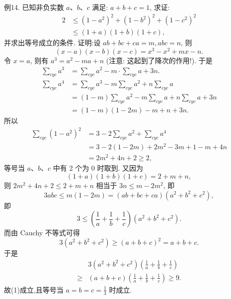 例14. 已知非负实数 $a 、 b 、 c$ 满足: $a+b+c=1$, 求证:
$$
\begin{aligned}
2 & \leqslant\left(1-a^2\right)^2+\left(1-b^2\right)^2+\left(1-c^2\right)^2 \\
& \leqslant(1+a)(1+b)(1+c),
\end{aligned}
$$
并求出等号成立的条件.
证明:设 $a b+b c+c a=m, a b c=n$, 则
$$
(x-a)(x-b)(x-c)=x^3-x^2+m x-n .
$$
令 $x=a$, 则有 $a^3=a^2-m a+n$ (注意: 这起到了降次的作用!). 于是
$$
\begin{aligned}
\sum_{c y c} a^3 & =\sum_{c y c} a^2-m \cdot \sum_{c y c} a+3 n . \\
\sum_{c y c} a^4 & =\sum_{c y c} a^3-m \sum_{c y c} a^2+n \sum_{c y c} a \\
& =(1-m) \sum_{c y c} a^2-m \sum_{c y c} a+n \sum_{c y c} a+3 n \\
& =(1-m)(1-2 m)-m+n+3 n .
\end{aligned}
$$
所以
$$
\begin{aligned}
\sum_{c y c}\left(1-a^2\right)^2 & =3-2 \sum_{c y c} a^2+\sum_{c y c} a^4 \\
& =3-2(1-2 m)+2 m^2-3 m+1-m+4 n \\
& =2 m^2+4 n+2 \geqslant 2,
\end{aligned}
$$
等号当 $a 、 b 、 c$ 中有 2 个为 0 时取到.
又因为
$$
(1+a)(1+b)(1+c)=2+m+n,
$$
则 $2 m^2+4 n+2 \leqslant 2+m+n$ 相当于 $3 n \leqslant m-2 m^2$, 即
$$
3 a b c \leqslant m(1-2 m)=(a b+b c+c a)\left(a^2+b^2+c^2\right),
$$
即
$$
3 \leqslant\left(\frac{1}{a}+\frac{1}{b}+\frac{1}{c}\right)\left(a^2+b^2+c^2\right) . \label{(1)}
$$
而由 Cauchy 不等式可得
$$
3\left(a^2+b^2+c^2\right) \geqslant(a+b+c)^2=a+b+c .
$$
于是
$$
\begin{aligned}
& 3\left(a^2+b^2+c^2\right)\left(\frac{1}{a}+\frac{1}{b}+\frac{1}{c}\right) \\
\geqslant & (a+b+c)\left(\frac{1}{a}+\frac{1}{b}+\frac{1}{c}\right) \geqslant 9 .
\end{aligned}
$$
故(1)成立,且等号当 $a=b=c=\frac{1}{3}$ 时成立.



